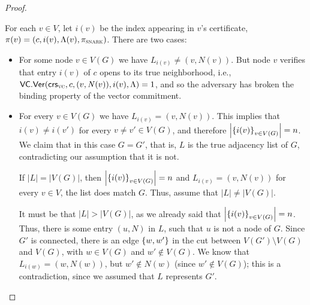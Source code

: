 \begin{proof}
\begin{itemize}
		For each $v \in V$,
		let $i(v)$ be the index appearing in $v$'s certificate, $\pi(v) = (c, i(v), \Lambda(v), \pi_\textsc{snark})$.
		There are two cases:
		\begin{itemize}
			\item For some node $v \in V(G)$ we have
				$L_{i(v)} \neq (v, N(v))$.
				But node $v$ verifies that
				entry $i(v)$ of $c$ opens
				to its true neighborhood,
				i.e.,
				$\mathsf{VC}.\mathsf{Ver}(\mathsf{crs}_\textsc{vc}, c, (v,\mathit{ N }(v)), i(v), \Lambda) = 1$,
				and so the adversary has broken the binding property of the vector commitment.
			\item For every $v \in V(G)$
				we have $L_{i(v)} = (v, N(v))$.
				This implies that $i(v) \neq i(v')$ for every $v \neq v' \in V(G)$,
				and therefore $\left| \left \{{ i(v) } \right \}_{v \in V(G)} \right| = n$.
				We claim that in this case $G = G'$,
				that is, $L$ is the true adjacency list of $G$, contradicting
				our assumption that it is not.

				If $|L| = |V(G)|$,
				then $\left| \left \{{ i(v) } \right \}_{v \in V(G)} \right| = n$
				and $L_{i(v)} = (v, N(v))$ for every $v \in V$,
				the list does match $G$.
				Thus, assume that $|L| \neq |V(G)|$.

				It must be that $|L| > |V(G)|$,
				as we already said that $\left| \left \{{ i(v) } \right \}_{v \in V(G)} \right| = n$.
				Thus, there is some entry $(u, N)$ in $L$,
				such that $u$ is not a node of $G$.
				Since $G'$ is connected,
				there is an edge $\left \{{w, w'} \right \}$
				in the cut between $V(G') \setminus V(G)$
				and $V(G)$,
				with $w \in V(G)$ and $w' \not \in V(G)$.
				We know that $L_{i(w)} = ( w, N(w) )$,
				but $w' \not \in N(w)$ (since $w' \not \in V(G)$);
				this is a contradiction,
				since we assumed that $L$ represents $G'$.
		\end{itemize}
\end{itemize}
\end{proof}


